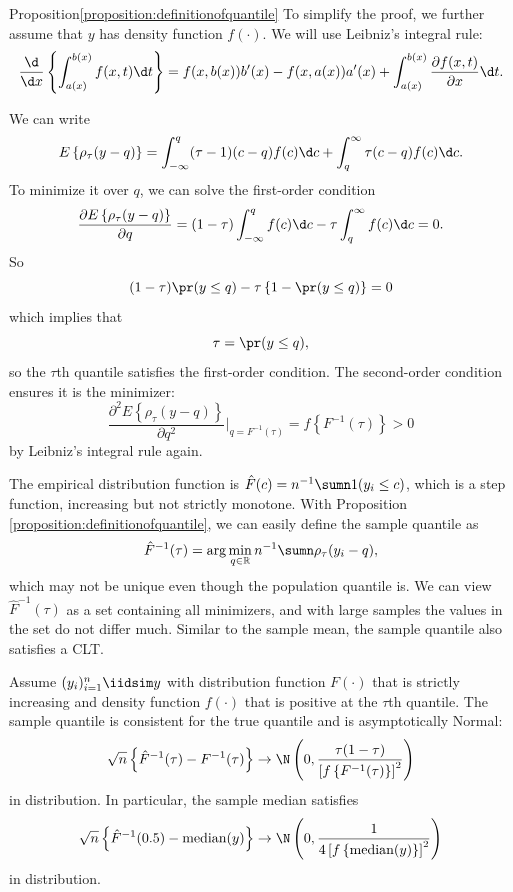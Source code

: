 \begin{myproof}{Proposition}{\ref{proposition:definitionofquantile}}
To simplify the proof, we further assume that $y$ has density function
$f(\cdot)$. We will use Leibniz's integral rule: 
\[
\frac{\d}{\d x}\left\{ \int_{a(x)}^{b(x)}f(x,t)\d t\right\} =f(x,b(x))b'(x)-f(x,a(x))a'(x)+\int_{a(x)}^{b(x)}\frac{\partial f(x,t)}{\partial x}\d t.
\]

We can write 
\[
E\left\{ \rho_{\tau}(y-q)\right\} =\int_{-\infty}^{q}(\tau-1)(c-q)f(c)\d c+\int_{q}^{\infty}\tau(c-q)f(c)\d c.
\]
To minimize it over $q$, we can solve the first-order condition
\[
\frac{\partial E\left\{ \rho_{\tau}(y-q)\right\} }{\partial q}=(1-\tau)\int_{-\infty}^{q}f(c)\d c-\tau\int_{q}^{\infty}f(c)\d c=0.
\]
So
\[
(1-\tau)\pr(y\leq q)-\tau\left\{ 1-\pr(y\leq q)\right\} =0
\]
which implies that
\[
\tau=\pr(y\leq q),
\]
so the $\tau$th quantile satisfies the first-order condition.
The second-order condition ensures it is the minimizer:
\[
\frac{\partial^{2}E\left\{ \rho_{\tau}(y-q)\right\} }{\partial q^{2}}\Big|_{q=F^{-1}(\tau)}=f\left\{ F^{-1}(\tau)\right\} >0
\]
by  Leibniz's integral rule again. 
\end{myproof}



The empirical distribution function is $\hat{F}(c)=n^{-1}\sumn1(y_{i}\leq c)$,
which is a step function, increasing but not strictly monotone. With
Proposition \ref{proposition:definitionofquantile}, we can easily define
the sample quantile as 
\[
\hat{F}^{-1}(\tau)=\arg\min_{q \in \mathbb{R}  }n^{-1}\sumn\rho_{\tau}(y_{i}-q),
\]
which may not be unique even though the population quantile is. We
can view $\hat{F}^{-1}(\tau)$ as a set containing all minimizers,
and with large samples the values in the set do not differ much. Similar
to the sample mean, the sample quantile also satisfies a CLT. 


\begin{theorem}\label{thm::sample-quantiles-asymptotics}
Assume $(y_{i})_{i=1}^{n}\iidsim y$ with distribution function $F(\cdot)$
that is strictly increasing and density function $f(\cdot)$ that
is positive at the $\tau$th quantile. The sample quantile
is consistent for the true quantile and is asymptotically Normal:
\[
\sqrt{n}\left\{ \hat{F}^{-1}(\tau)-F^{-1}(\tau)\right\} \rightarrow\N\left(0,\frac{\tau(1-\tau)}{\left[f\left\{ F^{-1}(\tau)\right\} \right]^{2}}\right)
\]
in distribution. In particular, the sample median satisfies
\[
\sqrt{n}\left\{ \hat{F}^{-1}(0.5)-\textup{median}(y)\right\} \rightarrow\N\left(0,\frac{1}{4\left[f\left\{ \textup{median}(y)\right\} \right]^{2}}\right)
\]
in distribution. 
\end{theorem}


